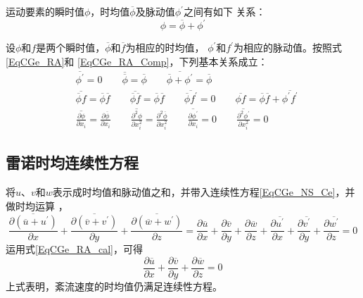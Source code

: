 运动要素的瞬时值$\phi$，时均值$\overline{\phi}$及脉动值$\phi^{\prime}$之间有如下
关系：
\begin{equation}
  \phi = \overline{\phi} + \phi^{\prime}
  \label{EqCGe_RA_Comp}
\end{equation}

设$\phi$和$f$是两个瞬时值，$\overline{\phi}$和$\overline{f}$为相应的时均值，
$\phi^{\prime}$和$f^{\prime}$为相应的脉动值。按照式\eqref{EqCGe_RA}和
\eqref{EqCGe_RA_Comp}，下列基本关系成立：
\begin{equation}
  \begin{aligned}
  &\overline{\phi^{\prime}} = 0
  \quad\quad
  \overline{\overline{\phi}} = \overline{\phi}
  \quad\quad
  \overline{\overline{\phi}+\phi^{\prime}} = \overline{\phi}
  \\
  & \overline{\overline{\phi}f} = \overline{\phi}\overline{f}
  \quad\quad
  \overline{\overline{\phi}\overline{f}} = \overline{\phi}\overline{f}
  \quad\quad
  \overline{\overline{\phi}f^{\prime}} = 0
  \quad\quad
  \overline{\phi f} = \overline{\phi}\overline{f} +
  \overline{\phi^{\prime}f^{\prime}}
  \\
  & \overline{\frac{\partial\phi}{\partial x_{i}}} = \frac{\partial \overline{\phi}}{\partial x_{i}}
  \quad\quad
  \overline{\frac{\partial^{2}\phi}{\partial x_{i}^{2}}} = \frac{\partial^{2}
  \overline{\phi}}{\partial x_{i}^{2}}
  \quad\quad
  \overline{\frac{\partial\phi^{\prime}}{\partial x_{i}}} = 0
  \quad\quad
  \overline{\frac{\partial^{2}\phi^{\prime}}{\partial x_{i}^{2}}} = 0
  \end{aligned}
  \label{EqCGe_RA_cal}
\end{equation}

\subsection{雷诺时均连续性方程}
将$u$、$v$和$w$表示成时均值和脉动值之和，并带入连续性方程\eqref{EqCGe_NS_Ce}，并做时均运算
，
\begin{equation*}
  \overline{
    \frac{\partial(\overline{u}+u^{\prime})}{\partial x}
  }
  +
  \overline{
    \frac{\partial(\overline{v}+v^{\prime})}{\partial y}
  }
  +
  \overline{
    \frac{\partial(\overline{w}+w^{\prime})}{\partial z}
  }
  =
  \frac{\partial \overline{u}}{\partial x} +
  \frac{\partial \overline{v}}{\partial y} +
  \frac{\partial \overline{w}}{\partial z} +
  \frac{\partial \overline{u^{\prime}}}{\partial x} +
  \frac{\partial \overline{v^{\prime}}}{\partial y} +
  \frac{\partial \overline{w^{\prime}}}{\partial z}
  =0
\end{equation*}
运用式\eqref{EqCGe_RA_cal}，可得
\begin{equation}
  \frac{\partial \overline{u}}{\partial x} +
  \frac{\partial \overline{v}}{\partial y} +
  \frac{\partial \overline{w}}{\partial z}
  =
  0
\end{equation}
上式表明，紊流速度的时均值仍满足连续性方程。

